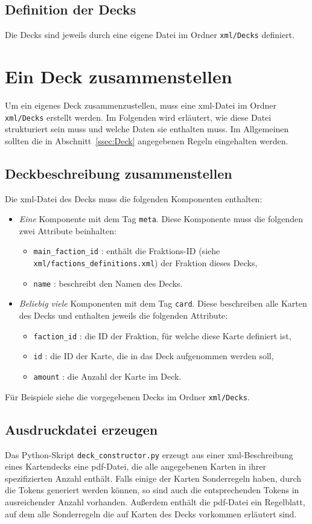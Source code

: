 \documentclass[a4paper,11pt]{report}
\newcommand{\sref}[1]{Abschnitt~\ref{#1}}
\begin{document}
\subsection{Definition der Decks}
Die Decks sind jeweils durch eine eigene Datei im Ordner \verb+xml/Decks+ definiert.

\section{Ein Deck zusammenstellen}
Um ein eigenes Deck zusammenzustellen, muss eine xml-Datei im Ordner \verb+xml/Decks+ erstellt werden. Im Folgenden wird erläutert, wie diese Datei strukturiert sein muss und welche Daten sie enthalten muss. Im Allgemeinen sollten die in \sref{ssec:Deck} angegebenen Regeln eingehalten werden.

\subsection{Deckbeschreibung zusammenstellen}
Die xml-Datei des Decks muss die folgenden Komponenten enthalten:
\begin{itemize}
	\item \emph{Eine} Komponente mit dem Tag \verb+meta+. Diese Komponente muss die folgenden zwei Attribute beinhalten:
	\begin{itemize}
		\item \verb+main_faction_id+ : enthält die Fraktions-ID (siehe \verb+xml/factions_definitions.xml+) der Fraktion dieses Decks,
		\item \verb+name+ : beschreibt den Namen des Decks.
	\end{itemize}
	\item \emph{Beliebig viele} Komponenten mit dem Tag \verb+card+. Diese beschreiben alle Karten des Decks und enthalten jeweils die folgenden Attribute:
	\begin{itemize}
		\item \verb+faction_id+ : die ID der Fraktion, für welche diese Karte definiert ist,
		\item \verb+id+ : die ID der Karte, die in das Deck aufgenommen werden soll,
		\item \verb+amount+ : die Anzahl der Karte im Deck.
	\end{itemize}
\end{itemize}
Für Beispiele siehe die vorgegebenen Decks im Ordner \verb+xml/Decks+.

\subsection{Ausdruckdatei erzeugen}
Das Python-Skript \verb+deck_constructor.py+ erzeugt aus einer xml-Beschreibung eines Kartendecks eine pdf-Datei, die alle angegebenen Karten in ihrer spezifizierten Anzahl enthält. Falls einige der Karten Sonderregeln haben, durch die Tokens generiert werden können, so sind auch die entsprechenden Tokens in ausreichender Anzahl vorhanden. Außerdem enthält die pdf-Datei ein Regelblatt, auf dem alle Sonderregeln die auf Karten des Decks vorkommen erläutert sind.
\end{document}
